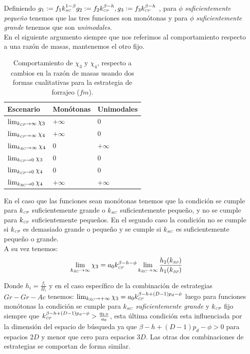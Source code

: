 Definiendo $g_1:= f_1 k_{\textit{\tiny RC}}^{1-\beta} g_2:= f_2 k_{\textit{\tiny CP}}^{\beta- h} , g_3 := f_3 k_{\textit{\tiny CP}}^{\beta-h} $ , para $\phi$ \emph{suficientemente peque\~no} tenemos que las tres funciones son mon\'otonas y para $\phi$ \emph{suficientemente grande} tenemos que son \emph{unimodales}.\\

En el siguiente argumento siempre que nos referimos al comportamiento respecto a una raz\'on de masas, mantenemos el otro fijo.\\

\begin{table}

\caption{Comportamiento de $\chi_3$ y $\chi_4$, respecto a cambios en la raz\'on de masas usando dos formas cualitativas para la estrategia de forrajeo ($fm$).}
\begin{center}
\begin{tabular}{p{1.5in}|m{1.5in}|m{1.5in}} 
 Escenario & Mon\'otonas  & Unimodales \\
\hline
$\lim_{k_{\textit{\tiny CP}} \to \infty} \chi_3$ & $+\infty$  & 0 \\
$\lim_{k_{\textit{\tiny CP}} \to \infty} \chi_4$ & $+\infty$  & 0 \\
$\lim_{k_{\textit{\tiny RC}} \to \infty} \chi_4$ & 0  & $+\infty$ \\
$\lim_{k_{\textit{\tiny CP}} \to 0} \chi_3$ & 0 & 0 \\
$\lim_{k_{\textit{\tiny CP}} \to 0} \chi_4$ & 0 & 0 \\
$\lim_{k_{\textit{\tiny RC}} \to 0} \chi_4$ & $+\infty$ & $+\infty$ \\
\hline

\end{tabular}
\end{center}
\end{table}

En el caso que las funciones sean mon\'otonas tenemos que la condici\'on se cumple para $k_{\textit{\tiny CP}}$ suficientemente grande o  $k_{\textit{\tiny RC}}$ suficientemente peque\~no, y no se cumple para $k_{\textit{\tiny CP}}$ suficientemente peque\~nos. En el segundo caso la condici\'on no se cumple si $k_{\textit{\tiny CP}}$ es demasiado grande o peque\~no y se cumple si $k_{\textit{\tiny RC}}$ es suficientemente peque\~no o grande.\\

A su vez tenemos:
\begin{equation}
  \lim_{k_{\textit{\tiny RC}} \to \infty} \chi_3 = a_0 k_{\textit{\tiny CP}}^{\beta - h - \phi} \lim_{k_{\textit{\tiny RC}} \to \infty} \frac{h_2(k_{\textit{\tiny RP}})}{h_1(k_{\textit{\tiny RP}})} 
\end{equation}

Donde $h_i = \frac{f_i}{\Pi_i}$ y en el caso espec\'ifico de la combinaci\'on de estrategias $Gr-Gr-Ac$ tenemos: $\lim_{k_{\textit{\tiny RC}} \to +\infty} \chi_3 = a_0 k_{\textit{\tiny CP}}^{\beta -h + (D-1)p_d - \phi}$ luego para funciones mon\'otonas la condici\'on se cumple para $k_{\textit{\tiny RC}}$ \emph{suficientemente grande} y $k_{\textit{\tiny CP}}$ fijo siempre que $k_{\textit{\tiny CP}}^{\beta - h + (D-1)p_d - \phi} > \frac{q_{2,0}}{a_0}$, esta \'ultima condici\'on esta influenciada por la dimensi\'on del espacio de b\'usqueda ya que $ \beta - h + (D-1)p_d - \phi >0$ para espacios $2D$ y menor que cero para espacios $3D$. Las otras dos combinaciones de estrategias se comportan de forma similar.\\

